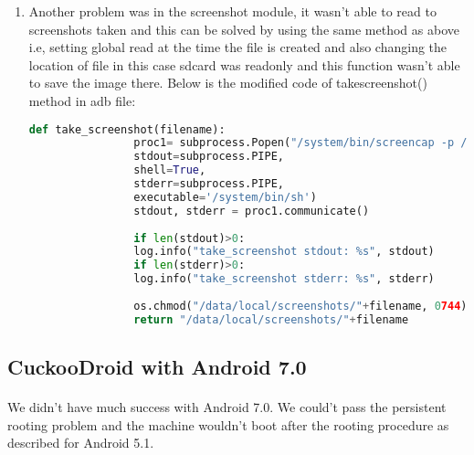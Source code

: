 \documentclass[../main.tex]{subfile}
\begin{document}
\begin{enumerate}
\begin{lstlisting}[language=python]
			# Parse the analysis configuration file generated by the agent.
			self.config = Config(cfg="analysis.conf")
			
			# We update the target according to its category. If it's a file, then
			# we store the path.
			if self.config.category == "file":
			self.target = os.path.join("/data/local/tmp", str(self.config.file_name))
			shutil.copyfile("config/hooks.json", "/data/local/tmp/hooks.json")
			os.chmod("/data/local/tmp/hooks.json", 0754) # Give set global read flag on hooks.json
			# If it's a URL, well.. we store the URL.
			else:
			self.target = self.config.target
		\end{lstlisting}
		
		\item Another problem was in the screenshot module, it wasn't able to read to screenshots taken and this can be solved by using the same method as above i.e, setting global read at the time the file is created and also changing the location of file in this case sdcard was readonly and this function wasn't able to save the image there. Below is the modified code of take\textunderscore screenshot() method in adb file:
		\begin{lstlisting}[language=python]
			def take_screenshot(filename):
				proc1= subprocess.Popen("/system/bin/screencap -p /data/local/screenshots/"+filename, # "/data/local/screenshots/" Fix for /sdcard read only
				stdout=subprocess.PIPE,
				shell=True,
				stderr=subprocess.PIPE,
				executable='/system/bin/sh')
				stdout, stderr = proc1.communicate()
				
				if len(stdout)>0:
				log.info("take_screenshot stdout: %s", stdout)
				if len(stderr)>0:
				log.info("take_screenshot stderr: %s", stderr)
				
				os.chmod("/data/local/screenshots/"+filename, 0744)
				return "/data/local/screenshots/"+filename
		\end{lstlisting}
		
		\end{enumerate}
		
		\subsection{CuckooDroid with Android 7.0}
		\paragraph{} We didn't have much success with Android 7.0. We could't pass the persistent rooting problem and the machine wouldn't boot after the rooting procedure as described for Android 5.1.
		
\end{document}
